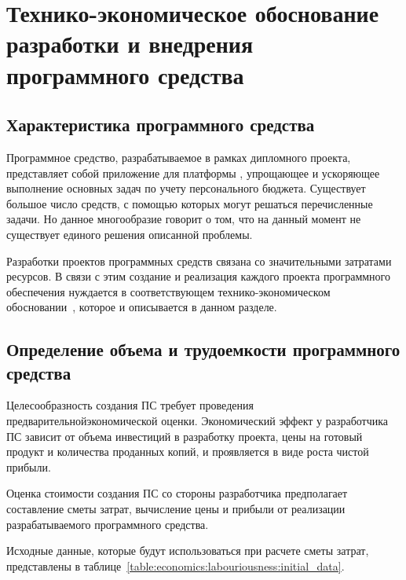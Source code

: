 


\section{Технико-экономическое обоснование разработки и внедрения программного средства}
\label{sec:economics}

\subsection{Характеристика программного средства}
\label{sec:economics:description}

Программное средство, разрабатываемое в рамках дипломного проекта, представляет собой приложение для платформы \andro, упрощающее и ускоряющее выполнение основных задач по учету персонального бюджета.
Существует большое число средств, с помощью которых могут решаться перечисленные задачи.
Но данное многообразие говорит о том, что на данный момент не существует единого решения описанной проблемы.

Разработки проектов программных средств связана со значительными затратами ресурсов.
В связи с этим создание и реализация каждого проекта программного обеспечения нуждается в соответствующем тех\-ни\-ко-эко\-но\-ми\-чес\-ком обосновании~\cite{palitsyn}, которое и описывается в данном разделе.

\subsection{Определение объема и трудоемкости программного средства}
\label{sec:economics:labouriousness}

Целесообразность создания ПС требует проведения предварительной\linebreak экономической оценки.
Экономический эффект у разработчика ПС зависит от объема инвестиций в разработку проекта, цены на готовый продукт и количества проданных копий, и проявляется в виде роста чистой прибыли.

Оценка стоимости создания ПС со стороны разработчика предполагает составление сметы затрат, вычисление цены и прибыли от реализации разрабатываемого программного средства.

Исходные данные, которые будут использоваться при расчете сметы затрат, представлены в таблице~\ref{table:economics:labouriousness:initial_data}.

